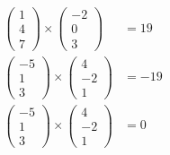 \documentclass[a4paper]{article}
\begin{document}
\subsection{}
  \begin{align*}
    \begin{pmatrix}
      1 \\ 4 \\ 7
    \end{pmatrix}
    \times
    \begin{pmatrix}
      -2 \\ 0 \\ 3
    \end{pmatrix}
    &= 19
    \\[1em]
    \begin{pmatrix}
      -5 \\ 1 \\ 3
    \end{pmatrix}
    \times
    \begin{pmatrix}
      4 \\ -2 \\ 1
    \end{pmatrix}
    &= -19
    \\[1em]
    \begin{pmatrix}
      -5 \\ 1 \\ 3
    \end{pmatrix}
    \times
    \begin{pmatrix}
      4 \\ -2 \\ 1
    \end{pmatrix}
    &= 0
  \end{align*}
\end{document}
